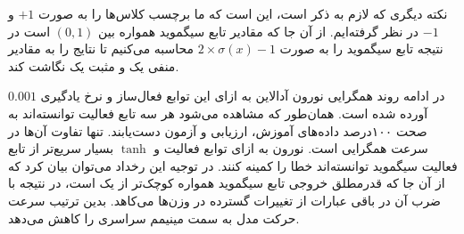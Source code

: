 \documentclass[12pt, a4paper]{article}
\begin{document}
نکته دیگری که لازم به ذکر است، این است که ما برچسب کلاس‌ها را به صورت $+1$ و $-1$ در نظر گرفته‌ایم.
از آن جا که مقادیر تابع سیگموید همواره بین $(0,1)$ است در نتیجه تابع سیگموید را به صورت
$2\times \sigma(x) - 1$ محاسبه می‌کنیم تا نتایج را به مقادیر منفی یک و مثبت یک نگاشت کند.

در ادامه روند همگرایی نورون آدالاین به ازای این توابع فعال‌ساز و نرخ یادگیری $0.001$ آورده شده است.
همان‌طور که مشاهده می‌شود هر سه تابع فعالیت توانسته‌اند به صحت ۱۰۰درصد داده‌های آموزش، ارزیابی و آزمون دست‌یابند.
تنها تفاوت آن‌ها در سرعت همگرایی است. نورون به ازای توابع فعالیت  و $\tanh$ بسیار سریع‌تر از
تابع فعالیت سیگموید توانسته‌اند خطا را کمینه کنند. در توجیه این رخداد می‌توان بیان کرد که
از آن جا که قدرمطلق خروجی تابع سیگموید همواره کوچک‌تر از یک است، در نتیجه با ضرب آن در باقی عبارات
از تغییرات گسترده در وزن‌ها می‌کاهد. بدین ترتیب سرعت حرکت مدل به سمت مینیمم سراسری
را کاهش می‌دهد.
\end{document}

